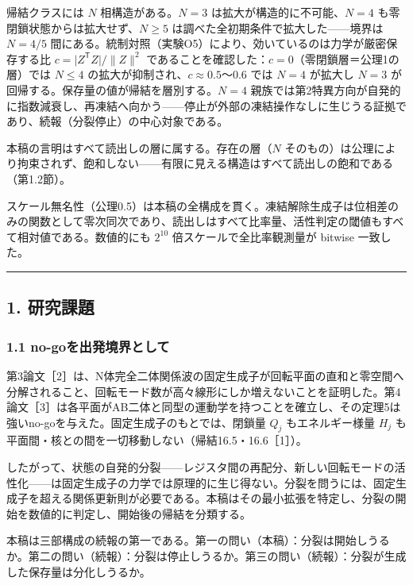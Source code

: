 \documentclass[
  a4paper,
]{ltjsarticle}
\begin{document}
帰結クラスには \(N\) 相構造がある。\(N=3\)
は拡大が構造的に不可能、\(N=4\) も零閉鎖状態からは拡大せず、\(N\ge5\)
は調べた全初期条件で拡大した------境界は \(N=4/5\)
間にある。統制対照（実験O5）により、効いているのは力学が厳密保存する比
\(c=\lvert Z^{\mathsf T}Z\rvert/\lVert Z\rVert^2\)
であることを確認した：\(c=0\)（零閉鎖層＝公理1の層）では \(N\le4\)
の拡大が抑制され、\(c\approx0.5\)〜\(0.6\) では \(N=4\) が拡大し \(N=3\)
が回帰する。保存量の値が帰結を層別する。\(N=4\)
親族では第2特異方向が自発的に指数減衰し、再凍結へ向かう------停止が外部の凍結操作なしに生じうる証拠であり、続報（分裂停止）の中心対象である。

本稿の言明はすべて読出しの層に属する。存在の層（\(N\)
そのもの）は公理により拘束されず、飽和しない------有限に見える構造はすべて読出しの飽和である（第1.2節）。

スケール無名性（公理0.5）は本稿の全構成を貫く。凍結解除生成子は位相差のみの関数として零次同次であり、読出しはすべて比率量、活性判定の閾値もすべて相対値である。数値的にも
\(2^{10}\) 倍スケールで全比率観測量が bitwise 一致した。

\begin{center}\rule{0.5\linewidth}{0.5pt}\end{center}

\subsection{1. 研究課題}\label{ux7814ux7a76ux8ab2ux984c}

\subsubsection{1.1
no-goを出発境界として}\label{no-goux3092ux51faux767aux5883ux754cux3068ux3057ux3066}

第3論文［2］は、N体完全二体関係波の固定生成子が回転平面の直和と零空間へ分解されること、回転モード数が高々線形にしか増えないことを証明した。第4論文［3］は各平面がAB二体と同型の運動学を持つことを確立し、その定理5は強いno-goを与えた。固定生成子のもとでは、閉鎖量
\(Q_j\) もエネルギー様量 \(H_j\)
も平面間・核との間を一切移動しない（帰結16.5・16.6［1］）。

したがって、状態の自発的分裂------レジスタ間の再配分、新しい回転モードの活性化------は固定生成子の力学では原理的に生じ得ない。分裂を問うには、固定生成子を超える関係更新則が必要である。本稿はその最小拡張を特定し、分裂の開始を数値的に判定し、開始後の帰結を分類する。

本稿は三部構成の続報の第一である。第一の問い（本稿）：分裂は開始しうるか。第二の問い（続報）：分裂は停止しうるか。第三の問い（続報）：分裂が生成した保存量は分化しうるか。
\end{document}
